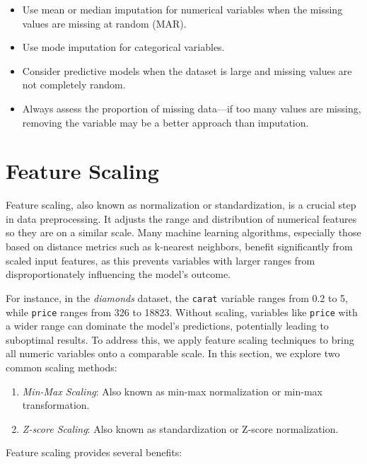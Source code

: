 \documentclass[
  11pt,
]{book}
\providecommand{\tightlist}{%
  \setlength{\itemsep}{0pt}\setlength{\parskip}{0pt}}
\theoremstyle{definition}
\theoremstyle{definition}
\theoremstyle{definition}
\theoremstyle{definition}
\theoremstyle{remark}
\begin{document}
\begin{itemize}
\tightlist
\item
  Use mean or median imputation for numerical variables when the missing values are missing at random (MAR).\\
\item
  Use mode imputation for categorical variables.\\
\item
  Consider predictive models when the dataset is large and missing values are not completely random.\\
\item
  Always assess the proportion of missing data---if too many values are missing, removing the variable may be a better approach than imputation.
\end{itemize}

\section{Feature Scaling}\label{feature-scaling}

Feature scaling, also known as normalization or standardization, is a crucial step in data preprocessing. It adjusts the range and distribution of numerical features so they are on a similar scale. Many machine learning algorithms, especially those based on distance metrics such as k-nearest neighbors, benefit significantly from scaled input features, as this prevents variables with larger ranges from disproportionately influencing the model's outcome.

For instance, in the \emph{diamonds} dataset, the \texttt{carat} variable ranges from 0.2 to 5, while \texttt{price} ranges from 326 to 18823. Without scaling, variables like \texttt{price} with a wider range can dominate the model's predictions, potentially leading to suboptimal results. To address this, we apply feature scaling techniques to bring all numeric variables onto a comparable scale. In this section, we explore two common scaling methods:

\begin{enumerate}
\def\labelenumi{\arabic{enumi}.}
\tightlist
\item
  \emph{Min-Max Scaling}: Also known as min-max normalization or min-max transformation.
\item
  \emph{Z-score Scaling}: Also known as standardization or Z-score normalization.
\end{enumerate}

Feature scaling provides several benefits:
\end{document}
